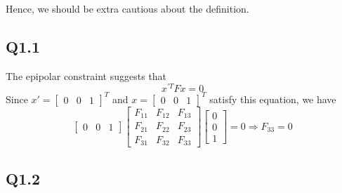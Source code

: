 \documentclass{article} %
\begin{document}
    Hence, we should be extra cautious about the definition.

    \subsection*{Q1.1}

    The epipolar constraint suggests that
    \begin{equation*}
    x^{'T}Fx=0
    \end{equation*}
    Since $x'=\left[\begin{array}{ccc}
    0 & 0 & 1
    \end{array}\right]^{T}$ and $x=\left[\begin{array}{ccc}
    0 & 0 & 1
    \end{array}\right]^{T}$ satisfy this equation, we have
    \begin{equation*}
    \left[\begin{array}{ccc}
    0 & 0 & 1
    \end{array}\right]\begin{bmatrix}
    F_{11} & F_{12} & F_{13}\\
    F_{21} & F_{22} & F_{23}\\
    F_{31} & F_{32} & F_{33}
    \end{bmatrix}\left[\begin{array}{c}
    0\\
    0\\
    1
    \end{array}\right]=0\Longrightarrow F_{33}=0
    \end{equation*}
    \subsection*{Q1.2}
\end{document}
